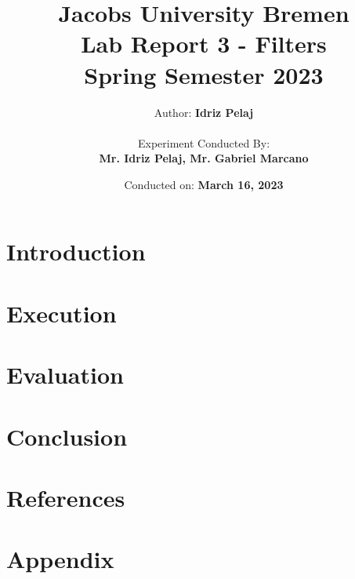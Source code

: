 \documentclass[12pt]{report}
\title{
    \textbf{Jacobs University Bremen} \\
    \vspace{1cm}
    \textbf{Lab Report 3 - Filters} \\ 
    Spring Semester 2023 \\
}
\author{
    Author: \textbf{Idriz Pelaj} \\
    \vspace{1cm} \\
    Experiment Conducted By: \\ \textbf{Mr. Idriz Pelaj, Mr. Gabriel Marcano}
}
\date{Conducted on: \textbf{March 16, 2023}}
\begin{document}
\maketitle

\chapter{Introduction}


\chapter{Execution}


\chapter{Evaluation}


\chapter{Conclusion}


\chapter{References}


\chapter{Appendix}

\end{document}
